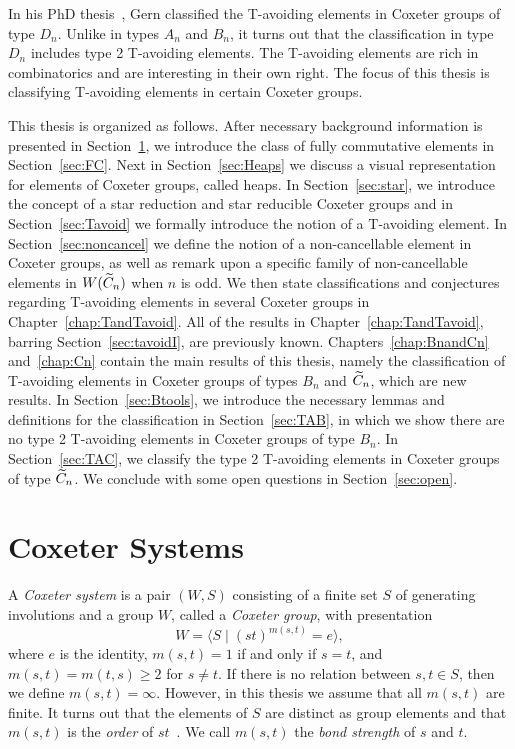 In his PhD thesis~\cite{Gern2013a}, Gern classified the T-avoiding elements in Coxeter groups of type $D_n$. Unlike in types $A_n$ and $B_n$, it turns out that the classification in type $D_n$ includes type 2 T-avoiding elements. The T-avoiding elements are rich in combinatorics and are interesting in their own right. The focus of this thesis is classifying T-avoiding elements in certain Coxeter groups.

This thesis is organized as follows. After necessary background information is presented in Section~\ref{sec:coxeter}, we introduce the class of fully commutative elements in Section~\ref{sec:FC}. Next in Section~\ref{sec:Heaps} we discuss a visual representation for elements of Coxeter groups, called heaps. In Section~\ref{sec:star}, we introduce the concept of a star reduction and star reducible Coxeter groups and in Section~\ref{sec:Tavoid} we formally introduce the notion of a T-avoiding element. In Section~\ref{sec:noncancel} we define the notion of a non-cancellable element in Coxeter groups, as well as remark upon a specific family of non-cancellable elements in $W(\widetilde{C}_n)$ when $n$ is odd. We then state classifications and conjectures regarding T-avoiding elements in several Coxeter groups in Chapter~\ref{chap:TandTavoid}. All of the results in Chapter~\ref{chap:TandTavoid}, barring Section~\ref{sec:tavoidI}, are previously known. Chapters~\ref{chap:BnandCn} and~\ref{chap:Cn} contain the main results of this thesis, namely the classification of T-avoiding elements in Coxeter groups of types $B_n$ and $\widetilde{C}_n$, which are new results. In Section~\ref{sec:Btools}, we introduce the necessary lemmas and definitions for the classification in Section~\ref{sec:TAB}, in which we show there are no type 2 T-avoiding elements in Coxeter groups of type $B_n$. In Section~\ref{sec:TAC}, we classify the type 2 T-avoiding elements in Coxeter groups of type $\widetilde{C}_n$. We conclude with some open questions in Section~\ref{sec:open}.



\section{Coxeter Systems}\label{sec:coxeter}

A \emph{Coxeter system} is a pair $(W,S)$ consisting of a finite set $S$ of generating involutions and a group $W$, called a \emph{Coxeter group}, with presentation 
\[ 
W = \langle S \mid (st)^{m(s, t)} = e  \rangle,
\]
where $e$ is the identity, $m(s,t) = 1$ if and only if $s = t$, and $m(s,t) = m(t,s) \geq 2$ for $s \neq t$. If there is no relation between $s,t \in S$, then we define $m(s,t)=\infty$. However, in this thesis we assume that all $m(s,t)$ are finite. It turns out that the elements of $S$ are distinct as group elements and that $m(s,t)$ is the \emph\emph{order} of $st$~\cite{Humphreys1990}. We call $m(s,t)$ the \emph{bond strength} of $s$ and $t$.\\

